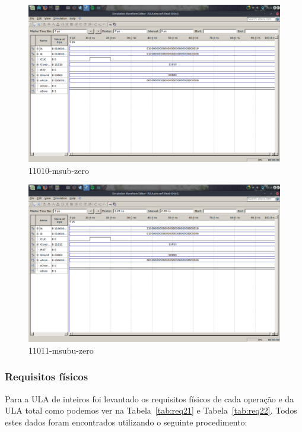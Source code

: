 \documentclass[12pt]{article}
\begin{document}
\begin{figure}[H]
	\centering
	\includegraphics[width=.8\textwidth]{11010-msub-zero.png}
	\caption{11010-msub-zero}
	\label{fig:11010-msub-zero}
\end{figure}

\begin{figure}[H]
	\centering
	\includegraphics[width=.8\textwidth]{11011-msubu-zero.png}
	\caption{11011-msubu-zero}
	\label{fig:11011-msubu-zero}
\end{figure}



\subsubsection{Requisitos físicos}
\label{subsubsec:ulafis}

Para a ULA de inteiros foi levantado os requisitos físicos de cada operação e da ULA total como podemos ver na Tabela~\ref{tab:req21} e Tabela~\ref{tab:req22}. Todos estes dados foram encontrados utilizando o seguinte procedimento:
\end{document}
